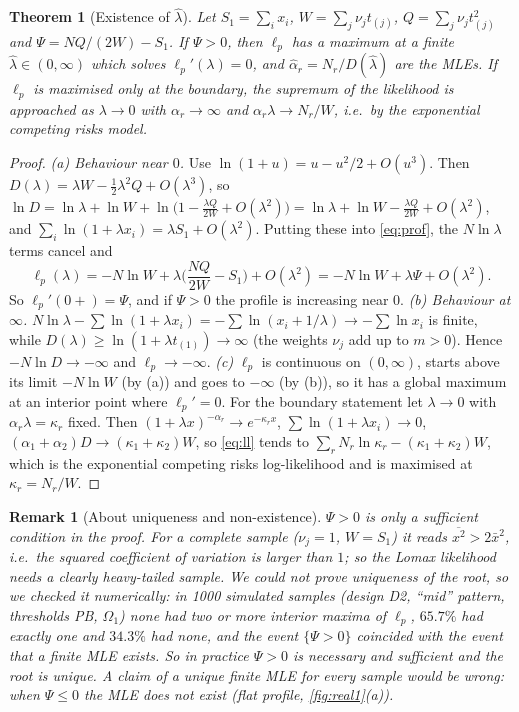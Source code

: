 \documentclass[a4paper,11pt]{article}
\newtheorem{theorem}{Theorem}[section]
\newtheorem{remark}{Remark}[section]
\begin{document}
\begin{theorem}[Existence of $\hat\lambda$]\label{thm:exist}
Let $S_1=\sum_ix_i$, $W=\sum_j\nu_jt_{(j)}$, $Q=\sum_j\nu_jt_{(j)}^2$ and $\Psi=NQ/(2W)-S_1$. If $\Psi>0$, then $\ell_p$ has a maximum at a finite $\hat\lambda\in(0,\infty)$ which solves $\ell_p'(\lambda)=0$, and $\hat\alpha_r=N_r/D(\hat\lambda)$ are the MLEs. If $\ell_p$ is maximised only at the boundary, the supremum of the likelihood is approached as $\lambda\to0$ with $\alpha_r\to\infty$ and $\alpha_r\lambda\to N_r/W$, i.e.\ by the exponential competing risks model.
\end{theorem}
\begin{proof}
\emph{(a) Behaviour near $0$.} Use $\ln(1+u)=u-u^2/2+O(u^3)$. Then $D(\lambda)=\lambda W-\tfrac12\lambda^2Q+O(\lambda^3)$, so
$\ln D=\ln\lambda+\ln W+\ln\!\big(1-\tfrac{\lambda Q}{2W}+O(\lambda^2)\big)=\ln\lambda+\ln W-\tfrac{\lambda Q}{2W}+O(\lambda^2)$, and $\sum_i\ln(1+\lambda x_i)=\lambda S_1+O(\lambda^2)$. Putting these into \eqref{eq:prof}, the $N\ln\lambda$ terms cancel and
\[
\ell_p(\lambda)=-N\ln W+\lambda\Big(\frac{NQ}{2W}-S_1\Big)+O(\lambda^2)=-N\ln W+\lambda\Psi+O(\lambda^2).
\]
So $\ell_p'(0+)=\Psi$, and if $\Psi>0$ the profile is increasing near $0$.
\emph{(b) Behaviour at $\infty$.} $N\ln\lambda-\sum\ln(1+\lambda x_i)=-\sum\ln(x_i+1/\lambda)\to-\sum\ln x_i$ is finite, while $D(\lambda)\ge\ln(1+\lambda t_{(1)})\to\infty$ (the weights $\nu_j$ add up to $m>0$). Hence $-N\ln D\to-\infty$ and $\ell_p\to-\infty$.
\emph{(c)} $\ell_p$ is continuous on $(0,\infty)$, starts above its limit $-N\ln W$ (by (a)) and goes to $-\infty$ (by (b)), so it has a global maximum at an interior point where $\ell_p'=0$.
For the boundary statement let $\lambda\to0$ with $\alpha_r\lambda=\kappa_r$ fixed. Then $(1+\lambda x)^{-\alpha_r}\to e^{-\kappa_rx}$, $\sum\ln(1+\lambda x_i)\to0$, $(\alpha_1+\alpha_2)D\to(\kappa_1+\kappa_2)W$, so \eqref{eq:ll} tends to $\sum_rN_r\ln\kappa_r-(\kappa_1+\kappa_2)W$, which is the exponential competing risks log-likelihood and is maximised at $\kappa_r=N_r/W$.
\end{proof}

\begin{remark}[About uniqueness and non-existence]
$\Psi>0$ is only a sufficient condition in the proof. For a complete sample ($\nu_j=1$, $W=S_1$) it reads $\overline{x^2}>2\bar x^{2}$, i.e.\ the squared coefficient of variation is larger than $1$; so the Lomax likelihood needs a clearly heavy-tailed sample. We could not prove uniqueness of the root, so we checked it numerically: in 1000 simulated samples (design D2, ``mid'' pattern, thresholds PB, $\Omega_1$) none had two or more interior maxima of $\ell_p$, $65.7\%$ had exactly one and $34.3\%$ had none, and the event $\{\Psi>0\}$ coincided with the event that a finite MLE exists. So in practice $\Psi>0$ is necessary and sufficient and the root is unique. A claim of a unique finite MLE for every sample would be wrong: when $\Psi\le0$ the MLE does not exist (flat profile, \cref{fig:real1}(a)).
\end{remark}
\end{document}
